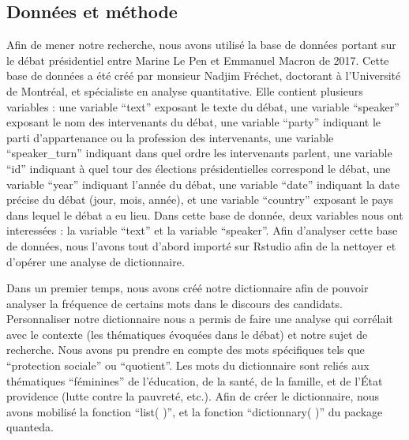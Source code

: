 \documentclass[
  letterpaper,
  DIV=11,
  numbers=noendperiod]{scrartcl}
\begin{document}
\hypertarget{donnuxe9es-et-muxe9thode}{%
\subsection{Données et méthode}\label{donnuxe9es-et-muxe9thode}}

Afin de mener notre recherche, nous avons utilisé la base de données
portant sur le débat présidentiel entre Marine Le Pen et Emmanuel Macron
de 2017. Cette base de données a été créé par monsieur Nadjim Fréchet,
doctorant à l'Université de Montréal, et spécialiste en analyse
quantitative. Elle contient plusieurs variables : une variable ``text''
exposant le texte du débat, une variable ``speaker'' exposant le nom des
intervenants du débat, une variable ``party'' indiquant le parti
d'appartenance ou la profession des intervenants, une variable
``speaker\_turn'' indiquant dans quel ordre les intervenants parlent,
une variable ``id'' indiquant à quel tour des élections présidentielles
correspond le débat, une variable ``year'' indiquant l'année du débat,
une variable ``date'' indiquant la date précise du débat (jour, mois,
année), et une variable ``country'' exposant le pays dans lequel le
débat a eu lieu. Dans cette base de donnée, deux variables nous ont
interessées : la variable ``text'' et la variable ``speaker''. Afin
d'analyser cette base de données, nous l'avons tout d'abord importé sur
Rstudio afin de la nettoyer et d'opérer une analyse de dictionnaire.

Dans un premier temps, nous avons créé notre dictionnaire afin de
pouvoir analyser la fréquence de certains mots dans le discours des
candidats. Personnaliser notre dictionnaire nous a permis de faire une
analyse qui corrélait avec le contexte (les thématiques évoquées dans le
débat) et notre sujet de recherche. Nous avons pu prendre en compte des
mots spécifiques tels que ``protection sociale'' ou ``quotient''. Les
mots du dictionnaire sont reliés aux thématiques ``féminines'' de
l'éducation, de la santé, de la famille, et de l'État providence (lutte
contre la pauvreté, etc.). Afin de créer le dictionnaire, nous avons
mobilisé la fonction ``list( )'', et la fonction ``dictionnary( )'' du
package quanteda.
\end{document}
